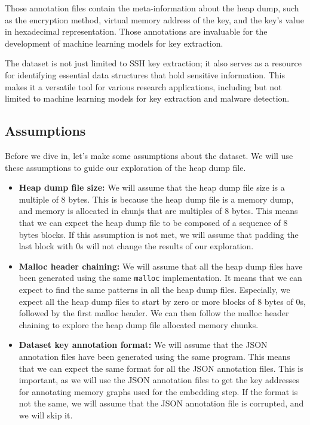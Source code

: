     Those annotation files contain the meta-information about the heap dump, such as the encryption method, virtual memory address of the key, and the key's value in hexadecimal representation. Those annotations are invaluable for the development of machine learning models for key extraction. 

    The dataset is not just limited to SSH key extraction; it also serves as a resource for identifying essential data structures that hold sensitive information. This makes it a versatile tool for various research applications, including but not limited to machine learning models for key extraction and malware detection. 

    \subsection{Assumptions}
    Before we dive in, let's make some assumptions about the dataset. We will use these assumptions to guide our exploration of the heap dump file. 

    \begin{itemize}
        \item \textbf{Heap dump file size:} We will assume that the heap dump file size is a multiple of 8 bytes. This is because the heap dump file is a memory dump, and memory is allocated in chunjs that are multiples of 8 bytes. This means that we can expect the heap dump file to be composed of a sequence of 8 bytes blocks. If this assumption is not met, we will assume that padding the last block with 0s will not change the results of our exploration.
        \item \textbf{Malloc header chaining:} We will assume that all the heap dump files have been generated using the same \lstinline[language=c]|malloc| implementation. It means that we can expect to find the same patterns in all the heap dump files. Especially, we expect all the heap dump files to start by zero or more blocks of 8 bytes of 0s, followed by the first malloc header. We can then follow the malloc header chaining to explore the heap dump file allocated memory chunks.
        \item \textbf{Dataset key annotation format:} We will assume that the JSON annotation files have been generated using the same program. This means that we can expect the same format for all the JSON annotation files. This is important, as we will use the JSON annotation files to get the key addresses for annotating memory graphs used for the embedding step. If the format is not the same, we will assume that the JSON annotation file is corrupted, and we will skip it.
    \end{itemize}


